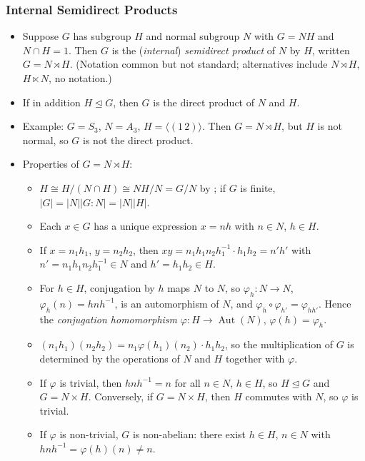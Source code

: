 \documentclass[../Odyssey_Project.tex]{subfiles}
\begin{document}
\subsubsection*{Internal Semidirect Products}
\begin{itemize}
    \item Suppose $G$ has subgroup $H$ and normal subgroup $N$ with $G = NH$ and $N \cap H = 1$. Then $G$ is the (\emph{internal}) \emph{semidirect product} of $N$ by $H$, written $G = N \rtimes H$. (Notation common but not standard; alternatives include $N \rtimes H$, $H \ltimes N$, no notation.)
    \item If in addition $H \trianglelefteq G$, then $G$ is the direct product of $N$ and $H$.
    \item Example: $G = S_3$, $N = A_3$, $H = \langle (1\,2) \rangle$. Then $G = N \rtimes H$, but $H$ is not normal, so $G$ is not the direct product.
    \item Properties of $G = N \rtimes H$:
    \begin{itemize}
        \item $H \cong H/(N \cap H) \cong NH/N = G/N$ by ; if $G$ is finite, $|G| = |N||G:N| = |N||H|$.
        \item Each $x \in G$ has a unique expression $x = nh$ with $n \in N$, $h \in H$.
        \item If $x = n_1 h_1$, $y = n_2 h_2$, then $xy = n_1 h_1 n_2 h_1^{-1} \cdot h_1 h_2 = n' h'$ with $n' = n_1 h_1 n_2 h_1^{-1} \in N$ and $h' = h_1 h_2 \in H$.
        \item For $h \in H$, conjugation by $h$ maps $N$ to $N$, so $\varphi_h : N \to N$, $\varphi_h(n) = hnh^{-1}$, is an automorphism of $N$, and $\varphi_h \circ \varphi_{h'} = \varphi_{hh'}$. Hence the \emph{conjugation homomorphism} $\varphi : H \to \operatorname{Aut}(N)$, $\varphi(h) = \varphi_h$.
        \item $(n_1 h_1)(n_2 h_2) = n_1 \varphi(h_1)(n_2) \cdot h_1 h_2$, so the multiplication of $G$ is determined by the operations of $N$ and $H$ together with $\varphi$.
        \item If $\varphi$ is trivial, then $hnh^{-1} = n$ for all $n \in N$, $h \in H$, so $H \trianglelefteq G$ and $G = N \times H$. Conversely, if $G = N \times H$, then $H$ commutes with $N$, so $\varphi$ is trivial.
        \item If $\varphi$ is non-trivial, $G$ is non-abelian: there exist $h \in H$, $n \in N$ with $hnh^{-1} = \varphi(h)(n) \neq n$.
    \end{itemize}
\end{itemize}
\end{document}
